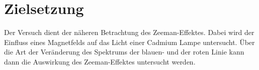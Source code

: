 \section{Zielsetzung}
\label{sec:Zielsetzung}

Der Versuch dient der näheren Betrachtung des Zeeman-Effektes. Dabei wird der Einfluss eines Magnetfelds auf das Licht einer Cadmium Lampe untersucht. Über die Art der Veränderung des Spektrums der blauen- und der roten Linie kann dann die Auswirkung des Zeeman-Effektes untersucht werden. 
